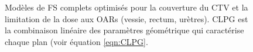 \begin{figure}[htp!]
  \centering
  \hspace{0.5cm}
  \hspace{0.5cm}
  \hspace{0.5cm}
\caption{\label{ModelGlobalFS} Modèles de FS complets optimisés pour la couverture du CTV et la limitation de la dose aux OARs (vessie, rectum, urètres). CLPG est la combinaison linéaire des paramètres géométrique qui caractérise chaque plan (voir équation \ref{eqn:CLPG}.}
\end{figure}
